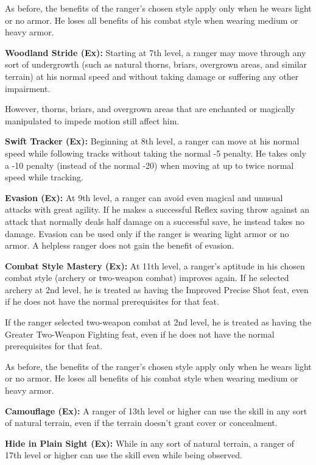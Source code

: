 As before, the benefits of the ranger's chosen style apply only when he wears light 
or no armor. He loses all benefits of his combat style when wearing medium or heavy 
armor.

\textbf{Woodland Stride (Ex):} Starting at 7th level, a ranger may move through 
any sort of undergrowth (such as natural thorns, briars, overgrown areas, and similar 
terrain) at his normal speed and without taking damage or suffering any other impairment.

However, thorns, briars, and overgrown areas that are enchanted or magically manipulated 
to impede motion still affect him.

\textbf{Swift Tracker (Ex):} Beginning at 8th level, a ranger can move at his normal 
speed while following tracks without taking the normal -5 penalty. He takes only 
a -10 penalty (instead of the normal -20) when moving at up to twice normal speed 
while tracking.

\textbf{Evasion (Ex):} At 9th level, a ranger can avoid even magical and unusual 
attacks with great agility. If he makes a successful Reflex saving throw against 
an attack that normally deals half damage on a successful save, he instead takes 
no damage. Evasion can be used only if the ranger is wearing light armor or no 
armor. A helpless ranger does not gain the benefit of evasion.

\textbf{Combat Style Mastery (Ex):} At 11th level, a ranger's aptitude in his chosen 
combat style (archery or two-weapon combat) improves again. If he selected archery 
at 2nd level, he is treated as having the Improved Precise Shot feat, even if he 
does not have the normal prerequisites for that feat.

If the ranger selected two-weapon combat at 2nd level, he is treated as having 
the Greater Two-Weapon Fighting feat, even if he does not have the normal prerequisites 
for that feat.

As before, the benefits of the ranger's chosen style apply only when he wears light 
or no armor. He loses all benefits of his combat style when wearing medium or heavy 
armor.

\textbf{Camouflage (Ex):} A ranger of 13th level or higher can use the  skill 
in any sort of natural terrain, even if the terrain doesn't grant cover or concealment.

\textbf{Hide in Plain Sight (Ex):} While in any sort of natural terrain, a ranger 
of 17th level or higher can use the  skill even while being observed.
